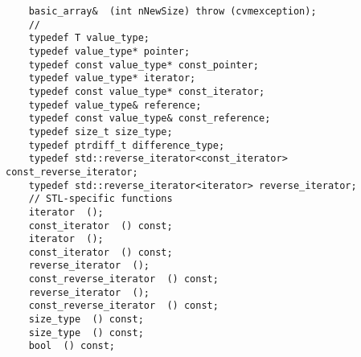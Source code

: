 \verb"    basic_array& "\verb" (int nNewSize) throw (cvmexception);"\\
\verb"    // "\\
\verb"    typedef T value_type;"\\
\verb"    typedef value_type* pointer;"\\
\verb"    typedef const value_type* const_pointer;"\\
\verb"    typedef value_type* iterator;"\\
\verb"    typedef const value_type* const_iterator;"\\
\verb"    typedef value_type& reference;"\\
\verb"    typedef const value_type& const_reference;"\\
\verb"    typedef size_t size_type;"\\
\verb"    typedef ptrdiff_t difference_type;"\\
\verb"    typedef std::reverse_iterator<const_iterator> const_reverse_iterator;"\\
\verb"    typedef std::reverse_iterator<iterator> reverse_iterator;"\\
\verb"    // STL-specific functions"\\
\verb"    iterator "\verb" ();"\\
\verb"    const_iterator "\verb" () const;"\\
\verb"    iterator "\verb" ();"\\
\verb"    const_iterator "\verb" () const;"\\
\verb"    reverse_iterator "\verb" ();"\\
\verb"    const_reverse_iterator "\verb" () const;"\\
\verb"    reverse_iterator "\verb" ();"\\
\verb"    const_reverse_iterator "\verb" () const;"\\
\verb"    size_type "\verb" () const;"\\
\verb"    size_type "\verb" () const;"\\
\verb"    bool "\verb" () const;"\\
